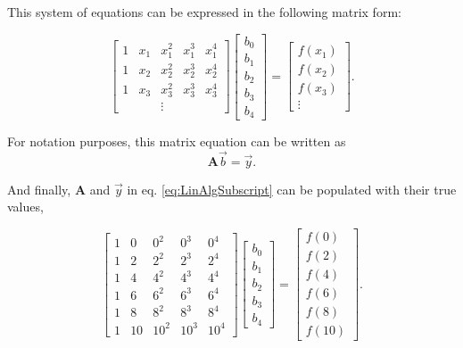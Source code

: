 This system of equations can be expressed in the following matrix form:

\begin{equation} \label{eq:LinAlgSubscript}
\begin{bmatrix}
1 & x_1 & x_1^2 & x_1^3 & x_1^4 \\
1 & x_2 & x_2^2 & x_2^3 & x_2^4 \\
1 & x_3 & x_3^2 & x_3^3 & x_3^4 \\
 & & \vdots & &
\end{bmatrix}
\begin{bmatrix}
b_0 \\
b_1 \\
b_2 \\
b_3 \\
b_4 
\end{bmatrix}
=
\begin{bmatrix}
f(x_1) \\ 
f(x_2) \\
f(x_3) \\ 
\vdots
\end{bmatrix}.
\end{equation}

For notation purposes, this matrix equation can be written as 
\begin{equation}\label{eq:aby}
\mathbf{A}\vec{b}=\vec{y}.
\end{equation}

And finally, $\mathbf{A}$ and $\vec{y}$ in eq. \ref{eq:LinAlgSubscript} can be populated with their true values,

\begin{equation} \label{eq:realValues}
\begin{bmatrix}
1 & 0 & 0^2 & 0^3 & 0^4 \\
1 & 2 & 2^2 & 2^3 & 2^4 \\
1 & 4 & 4^2 & 4^3 & 4^4 \\
1 & 6 & 6^2 & 6^3 & 6^4 \\
1 & 8 & 8^2 & 8^3 & 8^4 \\
1 & 10 & 10^2 & 10^3 & 10^4
\end{bmatrix}
\begin{bmatrix}
b_0 \\
b_1 \\
b_2 \\
b_3 \\
b_4 
\end{bmatrix}
=
\begin{bmatrix}
f(0) \\ 
f(2) \\
f(4) \\ 
f(6) \\
f(8) \\
f(10)
\end{bmatrix}.
\end{equation}


